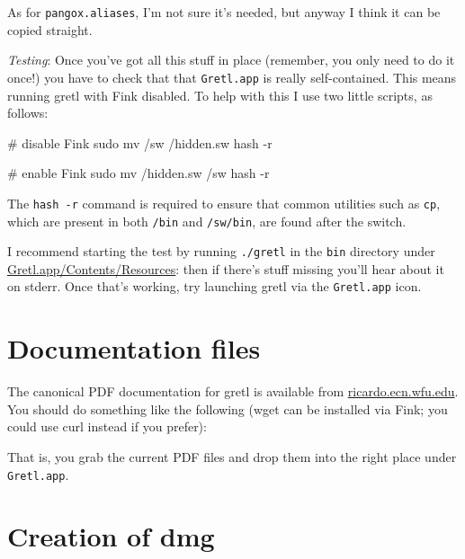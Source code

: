 \documentclass{article}
\begin{document}
As for \texttt{pangox.aliases}, I'm not sure it's needed, but anyway I
think it can be copied straight.

\textit{Testing}: Once you've got all this stuff in place (remember,
you only need to do it once!) you have to check that that
\texttt{Gretl.app} is really self-contained.  This means running gretl
with Fink disabled.  To help with this I use two little scripts, as
follows:

\begin{code}
# disable Fink
sudo mv /sw /hidden.sw
hash -r

# enable Fink
sudo mv /hidden.sw /sw
hash -r

\end{code}

The \texttt{hash -r} command is required to ensure that common
utilities such as \texttt{cp}, which are present in both \texttt{/bin}
and \texttt{/sw/bin}, are found after the switch.

I recommend starting the test by running \texttt{./gretl} in the
\texttt{bin} directory under \url{Gretl.app/Contents/Resources}: then
if there's stuff missing you'll hear about it on stderr.  Once that's
working, try launching gretl via the \texttt{Gretl.app} icon.

\section{Documentation files}

The canonical PDF documentation for gretl is available from
\url{ricardo.ecn.wfu.edu}.  You should do something like the following
(wget can be installed via Fink; you could use curl instead if you
prefer):


That is, you grab the current PDF files and drop them into the right
place under \texttt{Gretl.app}.

\section{Creation of dmg}
\end{document}
